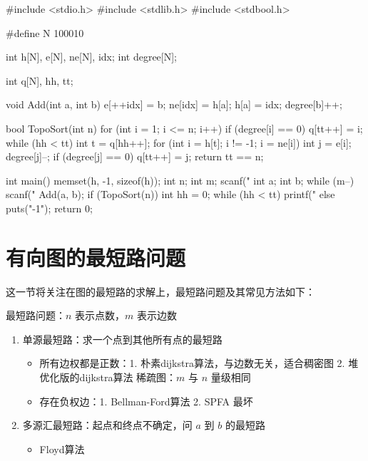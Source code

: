 \begin{mycpptwocol}[拓扑排序]
    #include <stdio.h>
    #include <stdlib.h>
    #include <stdbool.h>

    #define N 100010

    int h[N], e[N], ne[N], idx;
    int degree[N];

    int q[N], hh, tt;

    void Add(int a, int b) {
        e[++idx] = b;
        ne[idx] = h[a];
        h[a] = idx;
        degree[b]++;
    }

    bool TopoSort(int n) {
        for (int i = 1; i <= n; i++) {
            if (degree[i] == 0) {
                q[tt++] = i;
            }
        }
        while (hh < tt) {
            int t = q[hh++];
            for (int i = h[t]; i != -1; i = ne[i]) {
                int j = e[i];
                degree[j]--;
                if (degree[j] == 0) {
                    q[tt++] = j;
                }
            }
        }
        return tt == n;
    }

    int main()
        {
        memset(h, -1, sizeof(h));
        int n;
        int m;
        scanf("%
        int a;
        int b;
        while (m--) {
            scanf("%
            Add(a, b);
        }
        if (TopoSort(n)) {
            int hh = 0;
            while (hh < tt) {
                printf("%
            }
        } else {
            puts("-1");
        }
        return 0;
    }
\end{mycpptwocol}


\section{有向图的最短路问题}
这一节将关注在图的最短路的求解上，最短路问题及其常见方法如下：

最短路问题：$n$ 表示点数，$m$ 表示边数

\begin{enumerate}
    \item 单源最短路：求一个点到其他所有点的最短路
    \begin{itemize}
        \item 所有边权都是正数：1. 朴素dijkstra算法，与边数无关，适合稠密图 2. 堆优化版的dijkstra算法  稀疏图：$m$ 与 $n$ 量级相同
        \item 存在负权边：1. Bellman-Ford算法  2. SPFA 最坏 
    \end{itemize}
    \item 多源汇最短路：起点和终点不确定，问 $a$ 到 $b$ 的最短路
    \begin{itemize}
        \item Floyd算法 
    \end{itemize}
\end{enumerate}

